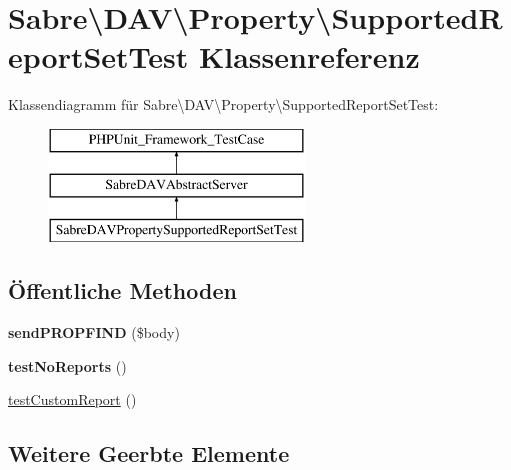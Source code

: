\hypertarget{class_sabre_1_1_d_a_v_1_1_property_1_1_supported_report_set_test}{}\section{Sabre\textbackslash{}D\+AV\textbackslash{}Property\textbackslash{}Supported\+Report\+Set\+Test Klassenreferenz}
\label{class_sabre_1_1_d_a_v_1_1_property_1_1_supported_report_set_test}
Klassendiagramm für Sabre\textbackslash{}D\+AV\textbackslash{}Property\textbackslash{}Supported\+Report\+Set\+Test\+:\begin{figure}[H]
\begin{center}
\leavevmode
\includegraphics[height=3.000000cm]{class_sabre_1_1_d_a_v_1_1_property_1_1_supported_report_set_test}
\end{center}
\end{figure}
\subsection*{Öffentliche Methoden}
\begin{DoxyCompactItemize}
\item 
\mbox{\label{class_sabre_1_1_d_a_v_1_1_property_1_1_supported_report_set_test_ab2c7d7606eb14c80d35dd263dc748e1a}} 
{\bfseries send\+P\+R\+O\+P\+F\+I\+ND} (\$body)
\item 
\mbox{\label{class_sabre_1_1_d_a_v_1_1_property_1_1_supported_report_set_test_aec752795ab2880c9c1e3c648ab0d090d}} 
{\bfseries test\+No\+Reports} ()
\item 
\mbox{\hyperlink{class_sabre_1_1_d_a_v_1_1_property_1_1_supported_report_set_test_af08864d13a6878ff54c15acaf6e257de}{test\+Custom\+Report}} ()
\end{DoxyCompactItemize}
\subsection*{Weitere Geerbte Elemente}


